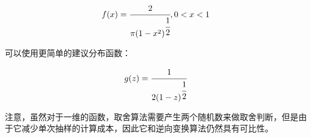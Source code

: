 \begin{equation}
	f(x)= \cfrac{2}{\pi(1-x^2)^{ \cfrac{1}{2}}},0<x<1
\end{equation}

\noindent 可以使用更简单的建议分布函数：

\begin{equation}
	g(z)= \cfrac{1}{2(1-z)^{ \cfrac{1}{2}}}
\end{equation}

\noindent 注意，虽然对于一维的函数，取舍算法需要产生两个随机数来做取舍判断，但是由于它减少单次抽样的计算成本，因此它和逆向变换算法仍然具有可比性。

